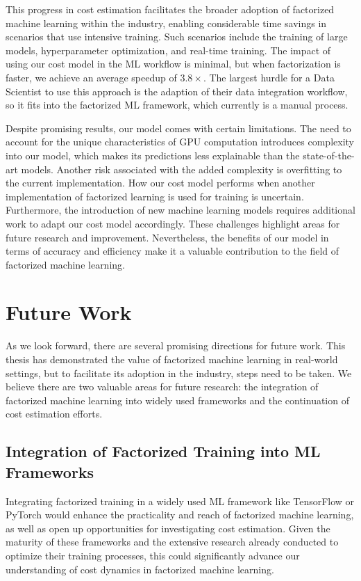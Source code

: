 This progress in cost estimation facilitates the broader adoption of factorized machine learning within the industry, enabling considerable time savings in scenarios that use intensive training. Such scenarios include the training of large models, hyperparameter optimization, and real-time training. The impact of using our cost model in the ML workflow is minimal, but when factorization is faster, we achieve an average speedup of $3.8\times$. The largest hurdle for a Data Scientist to use this approach is the adaption of their data integration workflow, so it fits into the factorized ML framework, which currently is a manual process.

Despite promising results, our model comes with certain limitations. The need to account for the unique characteristics of GPU computation introduces complexity into our model, which makes its predictions less explainable than the state-of-the-art models. Another risk associated with the added complexity is overfitting to the current implementation. How our cost model performs when another implementation of factorized learning is used for training is uncertain. Furthermore, the introduction of new machine learning models requires additional work to adapt our cost model accordingly. These challenges highlight areas for future research and improvement. Nevertheless, the benefits of our model in terms of accuracy and efficiency make it a valuable contribution to the field of factorized machine learning.

\section{Future Work}
\label{sec:7-future-work}
As we look forward, there are several promising directions for future work. This thesis has demonstrated the value of factorized machine learning in real-world settings, but to facilitate its adoption in the industry, steps need to be taken. We believe there are two valuable areas for future research: the integration of factorized machine learning into widely used frameworks and the continuation of cost estimation efforts.

\subsection{Integration of Factorized Training into ML Frameworks}
Integrating factorized training in a widely used ML framework like TensorFlow or PyTorch would enhance the practicality and reach of factorized machine learning, as well as open up opportunities for investigating cost estimation. Given the maturity of these frameworks and the extensive research already conducted to optimize their training processes, this could significantly advance our understanding of cost dynamics in factorized machine learning.

